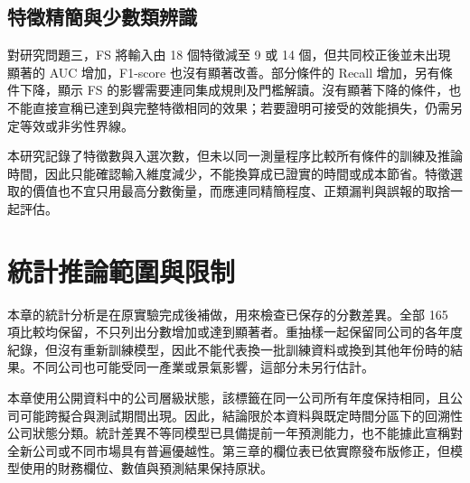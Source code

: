 \subsection{特徵精簡與少數類辨識}

對研究問題三，FS 將輸入由 18 個特徵減至 9 或 14 個，但共同校正後並未出現顯著的 AUC 增加，F1-score 也沒有顯著改善。部分條件的 Recall 增加，另有條件下降，顯示 FS 的影響需要連同集成規則及門檻解讀。沒有顯著下降的條件，也不能直接宣稱已達到與完整特徵相同的效果；若要證明可接受的效能損失，仍需另定等效或非劣性界線。

本研究記錄了特徵數與入選次數，但未以同一測量程序比較所有條件的訓練及推論時間，因此只能確認輸入維度減少，不能換算成已證實的時間或成本節省。特徵選取的價值也不宜只用最高分數衡量，而應連同精簡程度、正類漏判與誤報的取捨一起評估。

\section{統計推論範圍與限制}

本章的統計分析是在原實驗完成後補做，用來檢查已保存的分數差異。全部 165 項比較均保留，不只列出分數增加或達到顯著者。重抽樣一起保留同公司的各年度紀錄，但沒有重新訓練模型，因此不能代表換一批訓練資料或換到其他年份時的結果。不同公司也可能受同一產業或景氣影響，這部分未另行估計。

本章使用公開資料中的公司層級狀態，該標籤在同一公司所有年度保持相同，且公司可能跨擬合與測試期間出現。因此，結論限於本資料與既定時間分區下的回溯性公司狀態分類。統計差異不等同模型已具備提前一年預測能力，也不能據此宣稱對全新公司或不同市場具有普遍優越性。第三章的欄位表已依實際發布版修正，但模型使用的財務欄位、數值與預測結果保持原狀。
\endgroup

